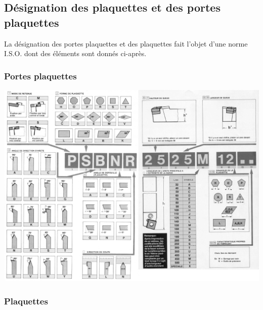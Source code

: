 \documentclass[11pt,oneside]{article}
\begin{document}
\subsection{Désignation des plaquettes et des portes plaquettes}
La désignation des portes plaquettes et des plaquettes fait l'objet d'une norme I.S.O. dont des éléments sont donnés ci-après.
\subsubsection{Portes plaquettes}
 
\begin{center}
\includegraphics[width=.8\textwidth]{png/fig_02}
\end{center}
\subsubsection{Plaquettes}
\end{document}
